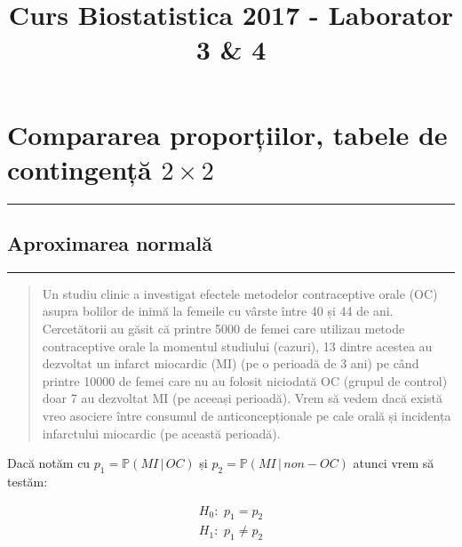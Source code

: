 \documentclass[]{article}
\title{Curs Biostatistica 2017 - Laborator 3 \& 4}
\author{}
\date{}
\begin{document}
\maketitle

{
\setcounter{tocdepth}{2}
\tableofcontents
}
\section{\texorpdfstring{Compararea proporțiilor, tabele de contingență
\(2\times2\)}{Compararea proporțiilor, tabele de contingență 2\textbackslash{}times2}}\label{compararea-proportiilor-tabele-de-contingenta-2times2}

\begin{center}\rule{0.5\linewidth}{\linethickness}\end{center}

\subsection{Aproximarea normală}\label{aproximarea-normala}

\begin{center}\rule{0.5\linewidth}{\linethickness}\end{center}

\begin{quote}
Un studiu clinic a investigat efectele metodelor contraceptive orale
(OC) asupra bolilor de inimă la femeile cu vârste între 40 și 44 de ani.
Cercetătorii au găsit că printre 5000 de femei care utilizau metode
contraceptive orale la momentul studiului (cazuri), 13 dintre acestea au
dezvoltat un infarct miocardic (MI) (pe o perioadă de 3 ani) pe când
printre 10000 de femei care nu au folosit niciodată OC (grupul de
control) doar 7 au dezvoltat MI (pe aceeași perioadă). Vrem să vedem
dacă există vreo asociere între consumul de anticoncepționale pe cale
orală și incidența infarctului miocardic (pe această perioadă).
\end{quote}

Dacă notăm cu \(p_1=\mathbb{P}(MI\,|\,OC)\) și
\(p_2=\mathbb{P}(MI\,|\,non-OC)\) atunci vrem să testăm:

\[
  \begin{array}{ll}
    H_0:\,\,p_1=p_2\\
    H_1:\,\,p_1\neq p_2
  \end{array}
\]
\end{document}
